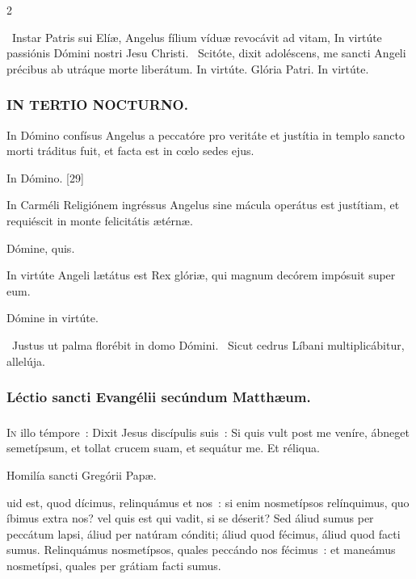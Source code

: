 \documentclass[9pt,twoside]{extarticle}
\begin{document}
\begin{multicols}{2}
{\begin{tightlist}{}
\item {}~Instar Patris sui Elíæ, Angelus fílium víduæ revocávit ad vitam, \textred{*} In virtúte passiónis Dómini nostri Jesu Christi.
~Scitóte, dixit adoléscens, me sancti Angeli précibus ab utráque morte liberátum. In virtúte. Glória Patri. In virtúte.
\end{tightlist}

\subsubsection*{\center \textsc{IN TERTIO NOCTURNO.}}
\begin{tightlist}{}
\item {} In Dómino confísus Angelus a peccatóre pro veritáte et justítia in templo sancto morti tráditus fuit, et facta est in cœlo sedes ejus.
\item {} In Dómino. [29]
\item {} In Carméli Religiónem ingréssus Angelus sine mácula operátus est justítiam, et requiéscit in monte felicitátis ætérnæ.
\item {} Dómine, quis.
\item {} In virtúte Angeli lætátus est Rex glóriæ, qui magnum decórem impósuit super eum.
\item {} Dómine in virtúte.
\item {}~Justus ut palma florébit in domo Dómini. ~Sicut cedrus Líbani multiplicábitur, allelúja.
\end{tightlist}

\subsubsection*{\center Léctio sancti Evangélii secúndum Matthæum.}
\subsubsection*{\center {}}
\lettrine{I}n illo témpore~: Dixit Jesus discípulis suis~: Si quis vult post me veníre, ábneget semetípsum, et tollat crucem suam, et sequátur me. Et réliqua.

\begin{center}Homilía sancti Gregórii Papæ.\\
\end{center}
uid est, quod dícimus, relinquámus et nos~: si enim nosmetípsos relínquimus, quo íbimus extra nos? vel quis est qui vadit, si se déserit? Sed áliud sumus per peccátum lapsi, áliud per natúram cónditi; áliud quod fécimus, áliud quod facti sumus. Relinquámus nosmetípsos, quales peccándo nos fécimus~: et maneámus nosmetípsi, quales per grátiam facti sumus.

}
\end{multicols}
\end{document}
